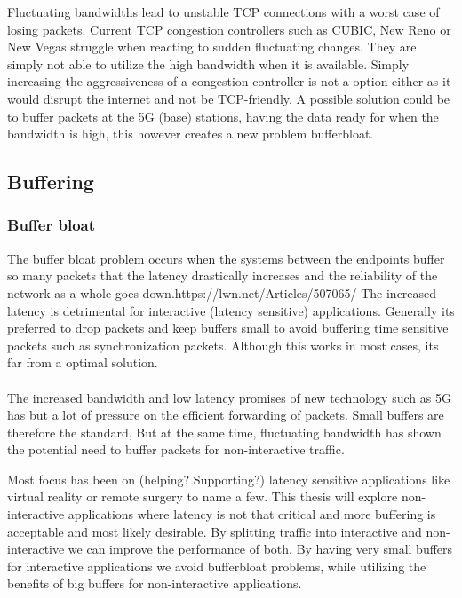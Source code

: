 \documentclass[a4paper,english, 11pt]{report}
\begin{document}
Fluctuating bandwidths lead to unstable TCP connections with a worst case of losing packets. Current TCP congestion controllers such as CUBIC, New Reno or New Vegas struggle when reacting to sudden fluctuating changes. They are simply not able to utilize the high bandwidth when it is available. Simply increasing the aggressiveness of a congestion controller is not a option either as it would disrupt the internet and not be TCP-friendly. A possible solution could be to buffer packets at the 5G (base) stations, having the data ready for when the bandwidth is high, this however creates a new problem bufferbloat.


\subsection{Buffering}
\subsubsection{Buffer bloat}
The buffer bloat problem occurs when the systems between the endpoints buffer so many packets that the latency drastically increases and the reliability of the network as a whole goes down.{https://lwn.net/Articles/507065/} The increased latency is detrimental for interactive (latency sensitive) applications. Generally its preferred to drop packets and keep buffers small to avoid buffering time sensitive packets such as synchronization packets. Although this works in most cases, its far from a optimal solution.\\\\

The increased bandwidth and low latency promises of new technology such as 5G has but a lot of pressure on the efficient forwarding of packets. Small buffers are therefore the standard, But at the same time, fluctuating bandwidth has shown the potential need to buffer packets for non-interactive traffic.

Most focus has been on (helping? Supporting?) latency sensitive applications like virtual reality or remote surgery to name a few. This thesis will explore non-interactive applications where latency is not that critical and more buffering is acceptable and most likely desirable. By splitting traffic into interactive and non-interactive we can improve the performance of both. By having very small buffers for interactive applications we avoid bufferbloat problems, while utilizing the benefits of big buffers for non-interactive applications.\\
\end{document}

